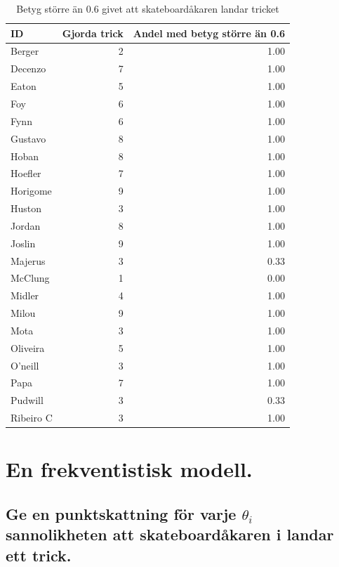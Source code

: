 \documentclass{article}
\begin{document}
\begin{table}[htbp]
    \centering
    \begin{tabular}{lrr}
      \toprule
      \textbf{ID} & \textbf{Gjorda trick} & \textbf{Andel med betyg större än 0.6} \\
      \midrule
      Berger     &      2 &              1.00 \\
      Decenzo    &      7 &              1.00 \\
      Eaton      &      5 &              1.00 \\
      Foy        &      6 &              1.00 \\
      Fynn       &      6 &              1.00 \\
      Gustavo    &      8 &              1.00 \\
      Hoban      &      8 &              1.00 \\
      Hoefler    &      7 &              1.00 \\
      Horigome   &      9 &              1.00 \\
      Huston     &      3 &              1.00 \\
      Jordan     &      8 &              1.00 \\
      Joslin     &      9 &              1.00 \\
      Majerus    &      3 &              0.33 \\
      McClung    &      1 &              0.00 \\
      Midler     &      4 &              1.00 \\
      Milou      &      9 &              1.00 \\
      Mota       &      3 &              1.00 \\
      Oliveira   &      5 &              1.00 \\
      O’neill    &      3 &              1.00 \\
      Papa       &      7 &              1.00 \\
      Pudwill    &      3 &              0.33 \\
      Ribeiro C  &      3 &              1.00 \\
      \bottomrule
    \end{tabular}
    \caption{Betyg större än 0.6 givet att skateboardåkaren landar tricket}
    \label{tab:1d}
\end{table}
\newpage

\section{En frekventistisk modell.}
\subsection{Ge en punktskattning för varje \texorpdfstring{$\theta_i$}, sannolikheten att skateboardåkaren i landar ett trick.}
\end{document}
